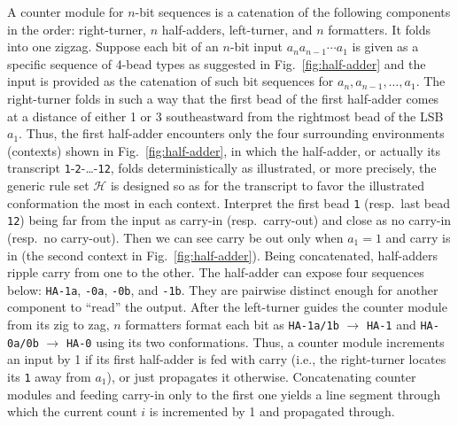 A counter module for $n$-bit sequences is a catenation of the following components in the order: right-turner, $n$ half-adders, left-turner, and $n$ formatters. 
It folds into one zigzag. 
Suppose each bit of an $n$-bit input $a_n a_{n-1} \cdots a_1$ is given as a specific sequence of 4-bead types as suggested in Fig.~\ref{fig:half-adder} and the input is provided as the catenation of such bit sequences for $a_n, a_{n-1}, \ldots, a_1$. 
The right-turner folds in such a way that the first bead of the first half-adder comes at a distance of either 1 or 3 southeastward from the rightmost bead of the LSB $a_1$. 
Thus, the first half-adder encounters only the four surrounding environments (contexts) shown in Fig.~\ref{fig:half-adder}, in which the half-adder, or actually its transcript {\tt 1}-{\tt 2}-\dots-{\tt 12}, folds deterministically as illustrated, or more precisely, the generic rule set $\mathcal{H}$ is designed so as for the transcript to favor the illustrated conformation the most in each context. 
Interpret the first bead {\tt 1} (resp.~last bead {\tt 12}) being far from the input as carry-in (resp.~carry-out) and close as no carry-in (resp.~no carry-out). 
Then we can see carry be out only when $a_1 = 1$ and carry is in (the second context in Fig.~\ref{fig:half-adder}). 
Being concatenated, half-adders ripple carry from one to the other. 
The half-adder can expose four sequences below: {\tt HA-1a}, {\tt -0a}, {\tt -0b}, and {\tt -1b}. 
They are pairwise distinct enough for another component to ``read'' the output. 
After the left-turner guides the counter module from its zig to zag, $n$ formatters format each bit as {\tt HA-1a/1b} $\to$ {\tt HA-1} and {\tt HA-0a/0b} $\to$ {\tt HA-0} using its two conformations. 
Thus, a counter module increments an input by 1 if its first half-adder is fed with carry (i.e., the right-turner locates its {\tt 1} away from $a_1$), or just propagates it otherwise. 
Concatenating counter modules and feeding carry-in only to the first one yields a line segment through which the current count $i$ is incremented by 1 and propagated through. 

